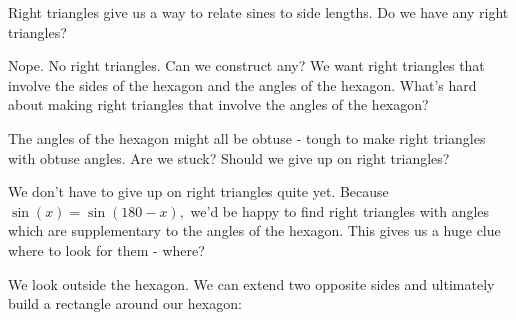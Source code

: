 



Right triangles give us a way to relate sines to side lengths.  Do we have any right triangles?



Nope.  No right triangles.  Can we construct any?  We want right triangles that involve the sides of the hexagon and the angles of the hexagon.  What's hard about making right triangles that involve the angles of the hexagon?



The angles of the hexagon might all be obtuse - tough to make right triangles with obtuse angles.  Are we stuck?  Should we give up on right triangles?



We don't have to give up on right triangles quite yet.  Because $\sin(x) = \sin(180-x),$ we'd be happy to find right triangles with angles which are supplementary to the angles of the hexagon.  This gives us a huge clue where to look for them - where?


We look outside the hexagon.  We can extend two opposite sides and ultimately build a rectangle around our hexagon:




